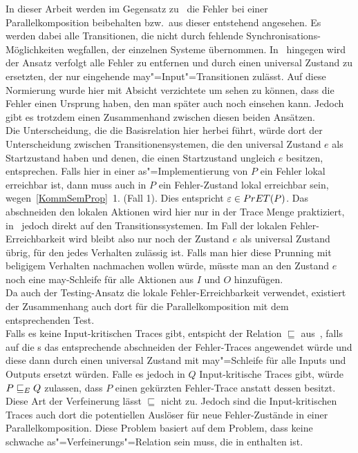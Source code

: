 In dieser Arbeit werden im Gegensatz zu~\cite{Vogler2016MIA3} die Fehler bei
einer Parallelkomposition beibehalten bzw.\ aus dieser entstehend angesehen. Es
werden dabei alle Transitionen, die nicht durch fehlende
Synchronisations-Möglichkeiten wegfallen, der einzelnen Systeme übernommen.
In~\cite{Vogler2016MIA3} hingegen wird der Ansatz verfolgt alle Fehler zu
entfernen und durch einen universal Zustand zu ersetzten, der nur eingehende
may"=Input"=Transitionen zulässt. Auf diese Normierung wurde hier mit Absicht
verzichtete um sehen zu können, dass die Fehler einen Ursprung haben, den man
später auch noch einsehen kann. Jedoch gibt es trotzdem einen Zusammenhand
zwischen diesen beiden Ansätzen.\\
Die Unterscheidung, die die Basisrelation \EBRel{} hier herbei führt, würde
dort der Unterscheidung zwischen Transitionensystemen, die den universal
Zustand $e$ als Startzustand haben und denen, die einen Startzustand ungleich
$e$ besitzen, entsprechen. Falls hier in einer as"=Implementierung von $P$ ein
Fehler lokal erreichbar ist, dann muss auch in $P$ ein Fehler-Zustand lokal
erreichbar sein, wegen~\ref{KommSemProp}~1. (Fall 1). Dies entspricht
$\varepsilon \in PrET (P)$. Das abschneiden den lokalen Aktionen wird hier nur
in der Trace Menge praktiziert, in~\cite{Vogler2016MIA3} jedoch direkt auf den
Transitionssystemen. Im Fall der lokalen Fehler-Erreichbarkeit wird bleibt also
nur noch der Zustand $e$ als universal Zustand übrig, für den jedes Verhalten
zulässig ist. Falls man hier diese Prunning mit beligigem Verhalten nachmachen
wollen würde, müsste man an den Zustand $e$ noch eine may-Schleife für alle
Aktionen aus $I$ und $O$ hinzufügen.\\
Da auch der Testing-Ansatz die lokale Fehler-Erreichbarkeit verwendet,
existiert der Zusammenhang auch dort für die Parallelkomposition mit dem
entsprechenden Test.\\
Falls es keine Input-kritischen Traces gibt, entspicht \ERel{} der Relation
$\sqsubseteq$ aus~\cite{Vogler2016MIA3}, falls auf die \MEIO{}s das
entsprechende abschneiden der Fehler-Traces angewendet würde und diese dann
durch einen universal Zustand mit may"=Schleife für alle Inputs und Outputs
ersetzt würden. Falle es jedoch in $Q$ Input-kritische Traces gibt, würde $P
 \sqsubseteq  _E Q$ zulassen, dass $P$ einen gekürzten Fehler-Trace anstatt dessen
besitzt. Diese Art der Verfeinerung lässt $\sqsubseteq$ nicht zu. Jedoch sind
die Input-kritischen Traces auch dort die potentiellen Auslöser für neue
Fehler-Zustände in einer Parallelkomposition. Diese Problem basiert auf dem
Problem, dass \ERel{} keine schwache as"=Verfeinerungs"=Relation sein muss, die
in \wasRel{} enthalten ist.
